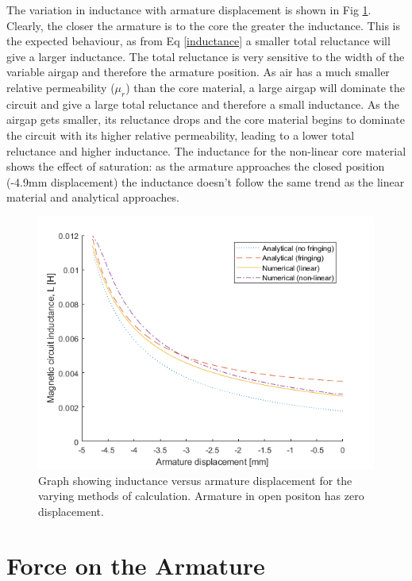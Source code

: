\documentclass[a4paper]{IEEEtran}
\begin{document}
     The variation in inductance with armature displacement is shown in Fig \ref{inductanceGraph}. Clearly, the closer the armature is to the core the greater the inductance. This is the expected behaviour, as from Eq \ref{inductance} a smaller total reluctance will give a larger inductance. The total reluctance is very sensitive to the width of the variable airgap and therefore the armature position. As air has a much smaller relative permeability (\(\mu_r\)) than the core material, a large airgap will dominate the circuit and give a large total reluctance and therefore a small inductance. As the airgap gets smaller, its reluctance drops and the core material begins to dominate the circuit with its higher relative permeability, leading to a lower total reluctance and higher inductance. The inductance for the non-linear core material shows the effect of saturation: as the armature approaches the closed position (-4.9mm displacement) the inductance doesn't follow the same trend as the linear material and analytical approaches.

    \begin{figure}[htb]
        \includegraphics[width = \linewidth]{Inductances.png}
        \caption{Graph showing inductance versus armature displacement for the varying methods of calculation. Armature in open positon has zero displacement.}
        \label{inductanceGraph} 
    \end{figure}


\section{Force on the Armature}
\end{document}
